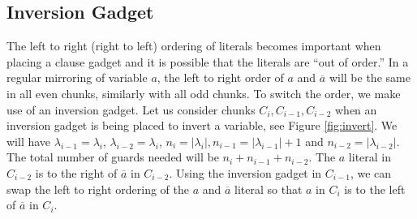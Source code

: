 \documentclass[11pt]{article}
\begin{document}
\subsection{Inversion Gadget}

The left to right (right to left) ordering of literals becomes important when placing a clause gadget and it is possible that the literals are ``out of order.''  In a regular mirroring of variable $a$, the left to right order of $a$ and $\overline{a}$ will be the same in all even chunks, similarly with all odd chunks.  To switch the order, we make use of an inversion gadget.  Let us consider chunks $C_i, C_{i-1}, C_{i-2}$ when an inversion gadget is being placed to invert a variable, see Figure \ref{fig:invert}.  We will have $\lambda_{i-1} = \lambda_i$, $\lambda_{i-2} = \lambda_i$, $n_i = | \lambda_i |, n_{i-1} = | \lambda_{i-1} | + 1$ and $n_{i-2} = | \lambda_{i-2} |$.  The total number of guards needed will be $n_i + n_{i-1} + n_{i-2}$.  The $a$ literal in $C_{i-2}$ is to the right of $\overline{a}$ in $C_{i-2}$.  Using the inversion gadget in $C_{i-1}$, we can swap the left to right ordering of the $a$ and $\overline{a}$ literal so that $a$ in $C_i$ is to the left of $\overline{a}$ in $C_i$.
\end{document}
